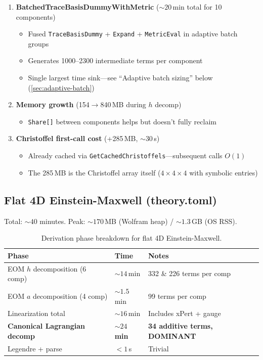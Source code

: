 \begin{enumerate}
  \item \textbf{BatchedTraceBasisDummyWithMetric} (${\sim}20$\,min total for 10 components)
  \begin{itemize}
    \item Fused \texttt{TraceBasisDummy} + \texttt{Expand} + \texttt{MetricEval} in adaptive batch groups
    \item Generates 1000--2300 intermediate terms per component
    \item Single largest time sink---see ``Adaptive batch sizing'' below (\cref{sec:adaptive-batch})
  \end{itemize}

  \item \textbf{Memory growth} (154$\to$840\,MB during $h$ decomp)
  \begin{itemize}
    \item \texttt{Share[]} between components helps but doesn't fully reclaim
  \end{itemize}

  \item \textbf{Christoffel first-call cost} (+285\,MB, ${\sim}30$\,s)
  \begin{itemize}
    \item Already cached via \texttt{GetCachedChristoffels}---subsequent calls $O(1)$
    \item The 285\,MB is the Christoffel array itself ($4 \times 4 \times 4$ with symbolic entries)
  \end{itemize}
\end{enumerate}

\subsection{Flat 4D Einstein-Maxwell (theory.toml)}
\label{sec:flat-4d}

Total: ${\sim}40$ minutes. Peak: ${\sim}170$\,MB (Wolfram heap) / ${\sim}1.3$\,GB (OS RSS).

\begin{table}[htbp]
\centering
\caption{Derivation phase breakdown for flat 4D Einstein-Maxwell.}
\label{tab:flat-phases}
\begin{tabular}{@{}lll@{}}
\toprule
Phase & Time & Notes \\
\midrule
EOM $h$ decomposition (6 comp) & ${\sim}14$\,min & 332 \& 226 terms per comp \\
EOM $a$ decomposition (4 comp) & ${\sim}1.5$\,min & 99 terms per comp \\
Linearization total & ${\sim}16$\,min & Includes xPert + gauge \\
\textbf{Canonical Lagrangian decomp} & \textbf{${\sim}24$\,min} & \textbf{34 additive terms, DOMINANT} \\
Legendre + parse & $<1$\,s & Trivial \\
\bottomrule
\end{tabular}
\end{table}


